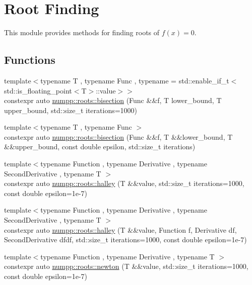 \hypertarget{group__numpp__roots}{}\section{Root Finding}
\label{group__numpp__roots}


This module provides methods for finding roots of $f(x) = 0$.  


\subsection*{Functions}
\begin{DoxyCompactItemize}
\item 
{\footnotesize template$<$typename T , typename Func , typename  = std\+::enable\+\_\+if\+\_\+t$<$std\+::is\+\_\+floating\+\_\+point$<$\+T$>$\+::value$>$$>$ }\\constexpr auto \hyperlink{group__numpp__roots_ga8b5bb65b3192456c184a331f88af0b56}{numpp\+::roots\+::bisection} (Func \&\&f, T lower\+\_\+bound, T upper\+\_\+bound, std\+::size\+\_\+t iterations=1000)
\item 
{\footnotesize template$<$typename T , typename Func $>$ }\\constexpr auto \hyperlink{group__numpp__roots_ga1b4f2040358e71ad1fd2bfcc8c71a8d6}{numpp\+::roots\+::bisection} (Func \&\&f, T \&\&lower\+\_\+bound, T \&\&upper\+\_\+bound, const double epsilon, std\+::size\+\_\+t iterations)
\item 
{\footnotesize template$<$typename Function , typename Derivative , typename Second\+Derivative , typename T $>$ }\\constexpr auto \hyperlink{group__numpp__roots_ga30924012d656a67696860b51d3d3f315}{numpp\+::roots\+::halley} (T \&\&value, std\+::size\+\_\+t iterations=1000, const double epsilon=1e-\/7)
\item 
{\footnotesize template$<$typename Function , typename Derivative , typename Second\+Derivative , typename T $>$ }\\constexpr auto \hyperlink{group__numpp__roots_gaa5dcba977340c78cd587fc7f9a3c0648}{numpp\+::roots\+::halley} (T \&\&value, Function f, Derivative df, Second\+Derivative dfdf, std\+::size\+\_\+t iterations=1000, const double epsilon=1e-\/7)
\item 
{\footnotesize template$<$typename Function , typename Derivative , typename T $>$ }\\constexpr auto \hyperlink{group__numpp__roots_ga756a768c79701c5506809765b24f89a0}{numpp\+::roots\+::newton} (T \&\&value, std\+::size\+\_\+t iterations=1000, const double epsilon=1e-\/7)

\end{DoxyCompactItemize}
